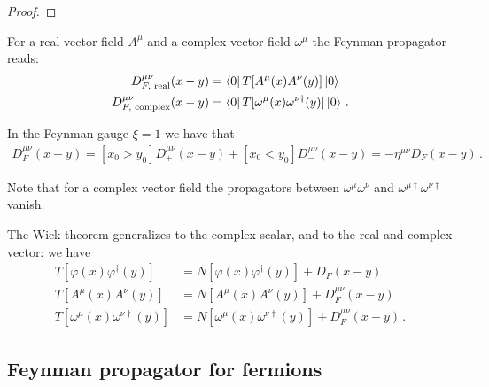\documentclass[main.tex]{subfiles}
\begin{document}
\begin{proof}
\end{proof}

\begin{definition}
For a real vector field \(A^{\mu }\) and a complex vector field \(\omega^{\mu }\) the Feynman propagator reads: 
%
\begin{subequations}
\begin{align}
D^{\mu \nu }_{F, \text{ real}} (x-y) &= \bra{0} T[A^{\mu }(x) A^{\nu }(y) ]\ket{0} \\
D^{\mu \nu }_{F, \text{ complex}} (x-y) &= \bra{0} T[\omega^{\mu }(x) \omega^{\nu \dag}(y) ]\ket{0}
\,.
\end{align}
\end{subequations}
\end{definition}

\begin{claim}
In the Feynman gauge \(\xi = 1\) we have that 
%
\begin{align}
D^{\mu \nu }_{F} (x-y) = [x_0 > y_0 ]
D^{\mu \nu }_{+ } (x-y) 
+
[x_0 < y_0 ]
D^{\mu \nu }_{-}(x-y) 
= - \eta^{\mu \nu } D_F (x-y)
\,.
\end{align}
\end{claim}

Note that for a complex vector field the propagators between \(\omega^{\mu } \omega^{\nu }\) and \(\omega^{\mu \dag} \omega^{\nu \dag}\) vanish. 

The Wick theorem generalizes to the complex scalar, and to the real and complex vector: we have 
%
\begin{subequations}
\begin{align}
T[\varphi (x) \varphi ^\dag (y)] &= N[\varphi (x) \varphi ^\dag (y)] + D_F (x-y) \\
T[A^{\mu } (x) A^{\nu } (y)] &= N[A^{\mu } (x) A^{\nu } (y)] + D_F^{\mu \nu } (x-y) \\
T[\omega^{\mu } (x) \omega^{\nu  \dag} (y)] &= N[\omega^{\mu } (x) \omega^{\nu \dag } (y)] + D_F^{\mu \nu } (x-y) 
\,.
\end{align}
\end{subequations}

\subsection{Feynman propagator for fermions}
\end{document}
